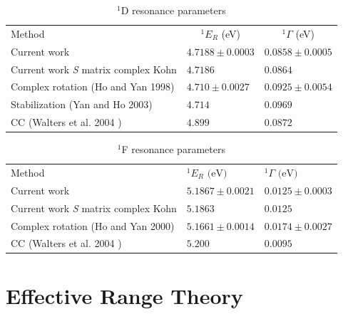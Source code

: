 \documentclass[preprint,showpacs,preprintnumbers,amsmath,amssymb,longbibliography,pra,aps]{revtex4-1}
\newcommand*{\thead}[1]{\multicolumn{1}{c}{#1}}
\begin{document}
\begin{table}[H]
\begin{center}
\begin{ruledtabular}
\begin{tabular}{l l l}
Method & \thead{$^1E_R$ (eV)} & \thead{$^1\Gamma$ (eV)} \\
\colrule
Current work & $4.7188 \pm 0.0003$ & $0.0858 \pm 0.0005$ \\
Current work \emph{S} matrix complex Kohn & $4.7186$ & $0.0864$ \\
Complex rotation (Ho and Yan 1998) \cite{Ho1998} & $4.710 \pm 0.0027$ & $0.0925 \pm 0.0054$  \\
Stabilization (Yan and Ho 2003) \cite{Yan2003} & $4.714$ & $0.0969$ \\
CC (Walters et al. 2004 \cite{Walters2004}) & $4.899$ & $0.0872$ \\
\end{tabular}
\end{ruledtabular}
\caption{$^1$D resonance parameters} %
\label{tab:DWaveResonances}
\end{center}
\end{table}


\begin{table}[H]
\begin{center}
\begin{ruledtabular}
\begin{tabular}{l l l}
Method & $^1E_R \text{ (eV)}$ & $^1\Gamma \text{ (eV)}$ \\
\colrule
Current work & $5.1867 \pm 0.0021$ & $0.0125 \pm 0.0003$ \\
Current work \emph{S} matrix complex Kohn & $5.1863$ & $0.0125$ \\
Complex rotation (Ho and Yan 2000) \cite{Ho2000} & $5.1661 \pm 0.0014$ & $0.0174 \pm 0.0027$  \\
CC (Walters et al. 2004 \cite{Walters2004}) & $5.200$ & $0.0095$ \\
\end{tabular}
\end{ruledtabular}
\caption{$^1$F resonance parameters} %
\label{tab:FWaveResonances}
\end{center}
\end{table}



\section{Effective Range Theory}
\end{document}

